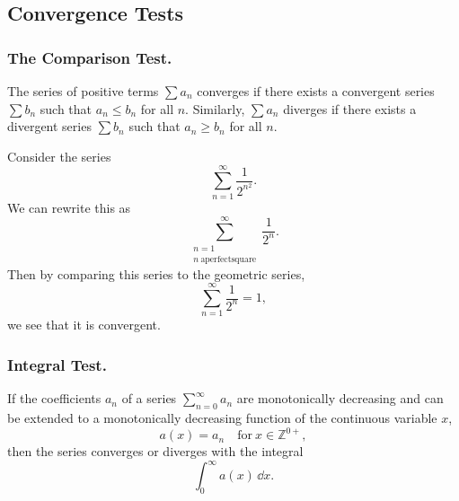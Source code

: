 \subsection{Convergence Tests}



\subsubsection{The Comparison Test.}

\begin{Result}
  The series of positive terms $\sum a_n$ converges if there 
  exists a convergent series $\sum b_n$ such that 
  $a_n \leq b_n$ for all $n$.
  Similarly, $\sum a_n$ diverges if there exists a divergent series
  $\sum b_n$ such that $a_n \geq b_n$ for all $n$.
\end{Result}




\begin{Example}
  Consider the series
  \[
  \sum_{n = 1}^\infty \frac{1}{2^{n^2}}.
  \]
  We can rewrite this as 
  \[
  \sum_{\substack{ n=1 \\ n\ \mathrm{a perfect square}}}^\infty \frac{1}{2^n}.
  \]
  Then by comparing this series to the geometric series,
  \[
  \sum_{n = 1}^\infty \frac{1}{2^n} = 1,
  \]
  we see that it is convergent.
\end{Example}












\subsubsection{Integral Test.}

\begin{Result}
  If the coefficients $a_n$ of a series $\sum_{n=0}^\infty a_n$ are monotonically 
  decreasing and can be extended to a monotonically decreasing function 
  of the continuous variable $x$,
  \[ 
  a(x) = a_n \quad \mathrm{for}\ x \in \mathbb{Z}^{0+},
  \]
  then the series converges or diverges with the integral
  \[
  \int_0^\infty a(x) \,\dd x.
  \]
\end{Result}

